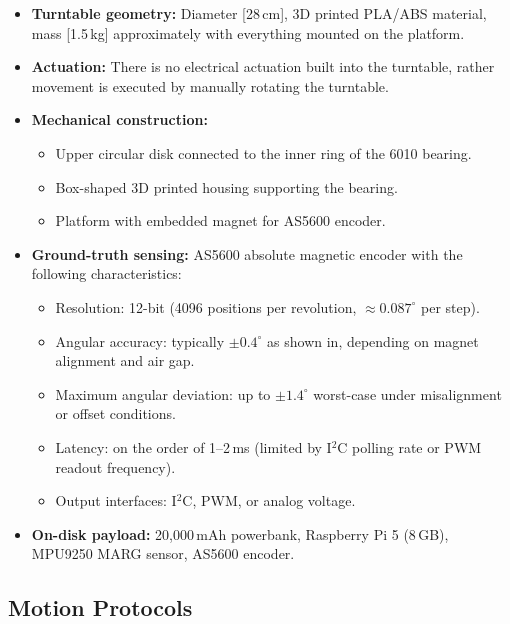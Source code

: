 \documentclass{iutbscthesis}
\begin{document}
\begin{itemize}
    \item \textbf{Turntable geometry:} Diameter [28\,cm], 3D printed PLA/ABS material, mass [1.5\,kg] approximately with everything mounted on the platform.
    \item \textbf{Actuation:} There is no electrical actuation built into the turntable, rather movement is executed by manually rotating the turntable.
    \item \textbf{Mechanical construction:} 
    \begin{itemize}
        \item Upper circular disk connected to the inner ring of the 6010 bearing.
        \item Box-shaped 3D printed housing supporting the bearing.
        \item Platform with embedded magnet for AS5600 encoder.
    \end{itemize}
    \item \textbf{Ground-truth sensing:} AS5600 absolute magnetic encoder with the following characteristics:
        \begin{itemize}
        \item Resolution: 12-bit (4096 positions per revolution, $\approx 0.087^{\circ}$ per step).
        \item Angular accuracy: typically $\pm 0.4^{\circ}$ as shown in\space\cite{AdafruitAS5600}, depending on magnet alignment and air gap.
        \item Maximum angular deviation: up to $\pm 1.4^{\circ}$ worst-case under misalignment or offset conditions.
        \item Latency: on the order of 1–2\,ms (limited by I$^2$C polling rate or PWM readout frequency).
        \item Output interfaces: I$^2$C, PWM, or analog voltage.
        \end{itemize}    \item \textbf{On-disk payload:} 20,000\,mAh powerbank, Raspberry Pi 5 (8\,GB), MPU9250 MARG sensor, AS5600 encoder.
\end{itemize}




\subsection{Motion Protocols}
\end{document}
